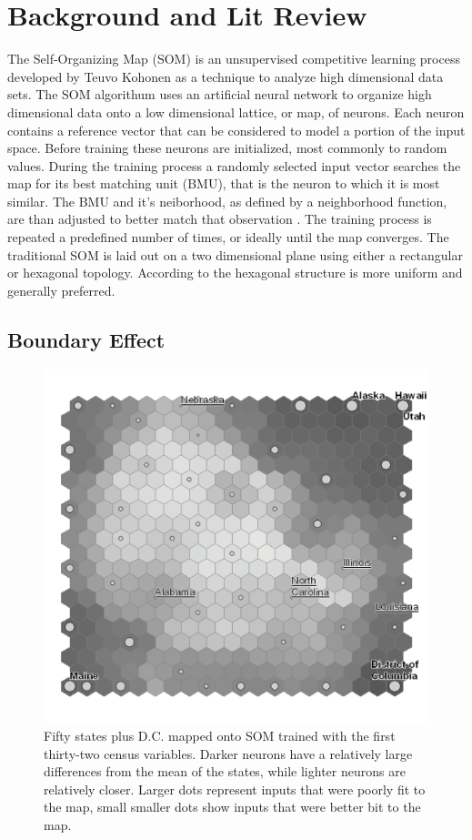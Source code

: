\documentclass[12pt]{article}
\begin{document}
\section{Background and Lit Review}
The Self-Organizing Map (SOM) is an unsupervised competitive learning process
developed by Teuvo Kohonen as a technique to analyze high dimensional data sets.
The SOM algorithum uses an artificial neural network to organize high
dimensional data onto a low dimensional lattice, or map, of neurons.  Each
neuron contains a reference vector that can be considered to model a portion of
the input space. Before training these neurons are initialized, most commonly to
random values.  During the training process a randomly selected input vector
searches the map for its best matching unit (BMU), that is the neuron to which
it is most similar. The BMU and it's neiborhood, as defined by a neighborhood
function, are than adjusted to better match that observation
\citep{Kohonen2000}.  The training process is repeated a predefined number of
times, or ideally until the map converges.  The traditional SOM is laid out on a
two dimensional plane using either a rectangular or hexagonal topology.
According to \cite{Wu:2006lr} the hexagonal structure is more uniform and
generally preferred.

\subsection{Boundary Effect}
\begin{figure}
\centering
\includegraphics[width=1\linewidth]{gridedge_grey.pdf}
\caption{Fifty states plus D.C. mapped onto SOM trained with the first thirty-two census
variables.  Darker neurons have a relatively large differences from the mean of
the states, while lighter neurons are relatively closer.  Larger dots represent inputs that were poorly fit to the map, small smaller dots show inputs that were better bit to the map.}
\label{figure1}
\end{figure}
\end{document}
